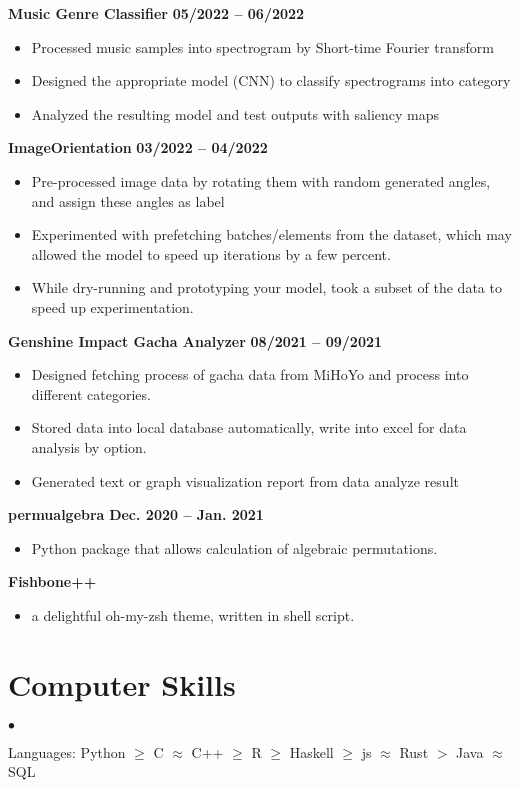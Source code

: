 \documentclass[margin,line]{res}
\newenvironment{list2}{
  \begin{list}{$\bullet$}{%
      \setlength{\itemsep}{0in}
      \setlength{\parsep}{0in} \setlength{\parskip}{0in}
      \setlength{\topsep}{0in} \setlength{\partopsep}{0in} 
      \setlength{\leftmargin}{0.2in}}}{\end{list}}
\begin{document}
\begin{resume}
{\bf Music Genre Classifier} \hfill {\bf 05/2022 -- 06/2022} \\
\begin{itemize}
	\item Processed music samples into spectrogram by Short-time Fourier transform
	\item Designed the appropriate model (CNN) to classify spectrograms into category
	\item Analyzed the resulting model and test outputs with saliency maps
\end{itemize}
\vspace{-.3cm}

{\bf ImageOrientation} \hfill {\bf 03/2022 -- 04/2022} \\
\begin{itemize}
	\item Pre-processed image data by rotating them with random generated angles, and assign these angles as label
	\item Experimented with prefetching batches/elements from the dataset,
		which may allowed the model to speed up iterations by a few percent.
	\item While dry-running and prototyping your model, took a subset of the data to speed up experimentation.
\end{itemize}
\vspace{-.3cm}

{\bf Genshine Impact Gacha Analyzer} \hfill {\bf 08/2021 -- 09/2021} \\
\begin{itemize}
	\item Designed fetching process of gacha data from MiHoYo and process into different categories.
	\item Stored data into local database automatically, write into excel for data analysis by option.
	\item Generated text or graph visualization report from data analyze result
\end{itemize}
\vspace{-.3cm}


{\bf permualgebra} \hfill {\bf Dec. 2020 -- Jan. 2021} \\
\begin{itemize}
  \item Python package that allows calculation of algebraic permutations.
\end{itemize}
\vspace{-.3cm}

{\bf Fishbone++} \\
\begin{itemize}
  \item a delightful oh-my-zsh theme, written in shell script.
\end{itemize}



\section{\sc Computer Skills} 
\begin{list2}
\item Languages: Python $\geq$ C $\approx$ C++ $\geq$ R $\geq$ Haskell $\geq$ js $\approx$ Rust $>$ Java $\approx$ SQL
\end{list2}



\end{resume}
\end{document}
